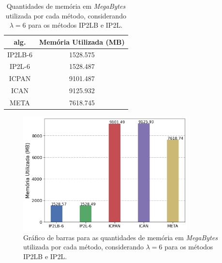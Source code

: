 \newpage
\begin{table}[h]
\centering
\begin{tabular}{|c|c|}
\hline
\textbf{alg.} & \textbf{Memória Utilizada (MB)} \\ \hline
IP2LB-6 & 1528.575 \\ \hline
IP2L-6 & 1528.487 \\ \hline
ICPAN & 9101.487 \\ \hline
ICAN & 9125.932 \\ \hline
META & 7618.745 \\ \hline
\end{tabular}
\caption{Quantidades de memória em \textit{MegaBytes} utilizada por cada método, considerando $\lambda = 6$ para os métodos IP2LB e IP2L.}
\label{tab:memory-usage-baselines-usaddr-tau-3}
\end{table}

\begin{figure}[h]
    \centering
    \includegraphics[width=0.8\textwidth]{figures/memory_usage_baselines_dataset_usaddr_tau_3.png}
    \caption{Gráfico de barras para as quantidades de memória em \textit{MegaBytes} utilizada por cada método, considerando $\lambda = 6$ para os métodos IP2LB e IP2L.}
    \label{fig:memory-usage-baselines-usaddr-tau-3}
\end{figure} 

\cleardoublepage
